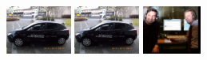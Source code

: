 \documentclass{acm_proc_article-sp}
\newcommand{\thumbheight}{16mm}
\newenvironment{thumbsequence}{}{\makebox[4mm]{}}
\begin{document}
\begin{figure}
\begin{centering}
	\begin{thumbsequence}
		\includegraphics[height=\thumbheight]{resources/wulff/exactduplicate1.jpg}
		\includegraphics[height=\thumbheight]{resources/wulff/exactduplicate2.jpg}
	\end{thumbsequence}
	\begin{thumbsequence}
		\includegraphics[height=\thumbheight]{resources/wulff/exactduplicate3.jpg}

\end{thumbsequence}
\end{centering}
\end{figure}
\end{document}
